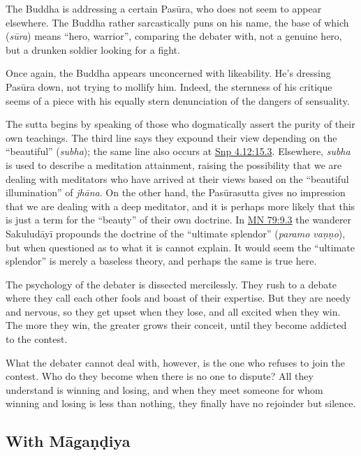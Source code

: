 \documentclass[12pt,openany]{book}%
\begin{document}
The Buddha is addressing a certain \textsanskrit{Pasūra}, who does not seem to appear elsewhere. The Buddha rather sarcastically puns on his name, the base of which (\textit{\textsanskrit{sūra}}) means “hero, warrior”, comparing the debater with, not a genuine hero, but a drunken soldier looking for a fight.

Once again, the Buddha appears unconcerned with likeability. He’s dressing \textsanskrit{Pasūra} down, not trying to mollify him. Indeed, the sternness of his critique seems of a piece with his equally stern denunciation of the dangers of sensuality.

The sutta begins by speaking of those who dogmatically assert the purity of their own teachings. The third line says they expound their view depending on the “beautiful” (\textit{subha}); the same line also occurs at \href{https://suttacentral.net/snp4.12/en/sujato\#15.3}{Snp 4.12:15.3}. Elsewhere, \textit{subha} is used to describe a meditation attainment, raising the possibility that we are dealing with meditators who have arrived at their views based on the “beautiful illumination” of \textit{\textsanskrit{jhāna}}. On the other hand, the \textsanskrit{Pasūrasutta} gives no impression that we are dealing with a deep meditator, and it is perhaps more likely that this is just a term for the “beauty” of their own doctrine. In \href{https://suttacentral.net/mn79/en/sujato\#9.3}{MN 79:9.3} the wanderer \textsanskrit{Sakuludāyī} propounds the doctrine of the “ultimate splendor” (\textit{paramo \textsanskrit{vaṇṇo}}), but when questioned as to what it is cannot explain. It would seem the “ultimate splendor” is merely a baseless theory, and perhaps the same is true here.

The psychology of the debater is dissected mercilessly. They rush to a debate where they call each other fools and boast of their expertise. But they are needy and nervous, so they get upset when they lose, and all excited when they win. The more they win, the greater grows their conceit, until they become addicted to the contest.

What the debater cannot deal with, however, is the one who refuses to join the contest. Who do they become when there is no one to dispute? All they understand is winning and losing, and when they meet someone for whom winning and losing is less than nothing, they finally have no rejoinder but silence.

\subsection*{With \textsanskrit{Māgaṇḍiya}}
\end{document}
